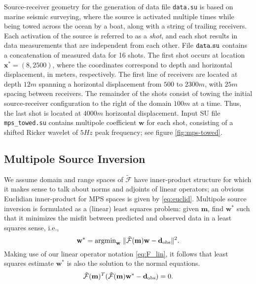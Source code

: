 Source-receiver geometry for the generation of data file {\tt data.su} is based on marine seismic surveying, where the source is activated multiple times while being towed across the ocean by a boat, along with a string of trailing receivers.
Each activation of the source is referred to as a {\em shot}, and each shot results in data measurements that are independent from each other.
File $\tt data.su$ contains a concatenation of measured data for 16 shots.
The first shot occurs at location $\mathbf x^* = (8,2500)$, where the coordinates correspond to depth and horizontal displacement, in meters, respectively.
The first line of receivers are located at depth $12m$ spanning a horizontal displacement from $500$ to $2300m$, with $25m$ spacing between receivers.  
The remainder of the shots consist of towing the initial source-receiver configuration to the right of the domain $100m$ at a time.
Thus, the last shot is located at $4000m$ horizontal displacement.
Input SU file {\tt mps\_towed.su} contains multipole coefficient $\mathbf w$ for each shot, consisting of a shifted Ricker wavelet of $5Hz$ peak frequency; see figure \ref{fig:mps-towed}.

\subsection{Multipole Source Inversion}

We assume domain and range spaces of $\tilde{\mathcal F}$ have inner-product structure for which it makes sense to talk about norms and adjoints of linear operators; an obvious Euclidian inner-product for MPS spaces is given by \ref{eq:euclid}.
Multipole source inversion is formulated as a (linear) least squares problem: given $\mathbf m$, find $\mathbf w^*$ such that it minimizes the misfit between predicted and observed data in a least squares sense, i.e.,
\begin{equation}\label{eq:LLS}
	\mathbf w^* = {\rm argmin}_{\mathbf w} \; 
	\| \tilde{\mathcal F}(\mathbf m)\mathbf w - \mathbf d_{\rm obs}\|^2.
\end{equation}
Making use of our linear operator notation \ref{eq:F_lin}, it follows that least squares estimate $\mathbf w^*$ is also the solution to the normal equations.
\begin{equation}\label{eq:normal}
	\tilde{\mathcal F}(\mathbf m)^T (\tilde{\mathcal F}(\mathbf m)\mathbf w^* - \mathbf d_{\rm obs}) =0.
\end{equation}

